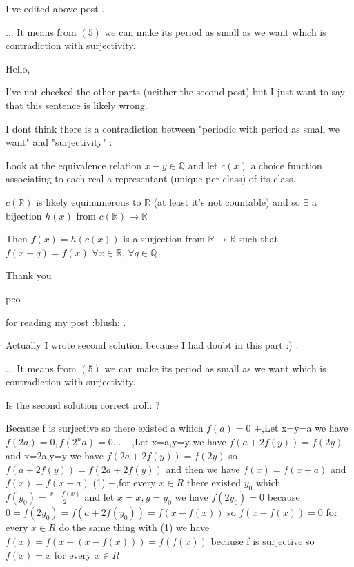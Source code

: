 \begin{solution}
	I`ve edited above post .
\end{solution}



\begin{solution}
	\begin{tcolorbox} ... It means from $(5)$ we can make its period as small as we want which is contradiction with surjectivity.\end{tcolorbox}
Hello, 

I've not checked the other parts (neither the second post) but I just want to say that this sentence is likely wrong.

I dont think there is a contradiction between "periodic with period as small we want" and "surjectivity" :

Look at the equivalence relation $x-y\in\mathbb Q$ and let $c(x)$ a choice function associating to each real a representant (unique per class) of its class.

$c(\mathbb R)$ is likely equinumerous to $\mathbb R$ (at least it's not countable) and so $\exists$ a bijection $h(x)$ from $c(\mathbb R)\to\mathbb R$

Then $f(x)=h(c(x))$ is a surjection from $\mathbb R\to\mathbb R$ such that $f(x+q)=f(x)$ $\forall x\in\mathbb R$, $\forall q\in\mathbb Q$
\end{solution}



\begin{solution}
	Thank you \begin{bolded}pco \end{bolded} for reading my post  :blush: .

Actually I wrote second solution because I had doubt in this part  :) . 

\begin{tcolorbox} ... It means from $(5)$ we can make its period as small as we want which is contradiction with surjectivity.\end{tcolorbox}

Is the second solution correct  :roll: ?
\end{solution}



\begin{solution}
	Because f is surjective so there existed  a which 
$f(a)=0$
+,Let x=y=a we have $f(2a)=0,f(2^na)=0...$
+,Let x=a,y=y we have $f(a+2f(y))=f(2y)$ and x=2a,y=y we have $f(2a+2f(y))=f(2y)$
so $f(a+2f(y))=f(2a+2f(y))$ and then we have $f(x)=f(x+a)$ and $f(x)=f(x-a)$ (1)
+,for every $x\in R$ there existed $y_0$ which $f(y_0)=\frac{x-f(x)}{2}$
and let $x=x,y=y_0$ we have $f(2y_0)=0$
because $0=f(2y_0)=f(a+2f(y_0))=f(x-f(x))$
so $f(x-f(x))=0$ for every $x\in R$
do the same thing with (1) we have 
$f(x)=f(x-(x-f(x)))=f(f(x))$
because f is surjective so $f(x)=x $ for every $x\in R$
\end{solution}



